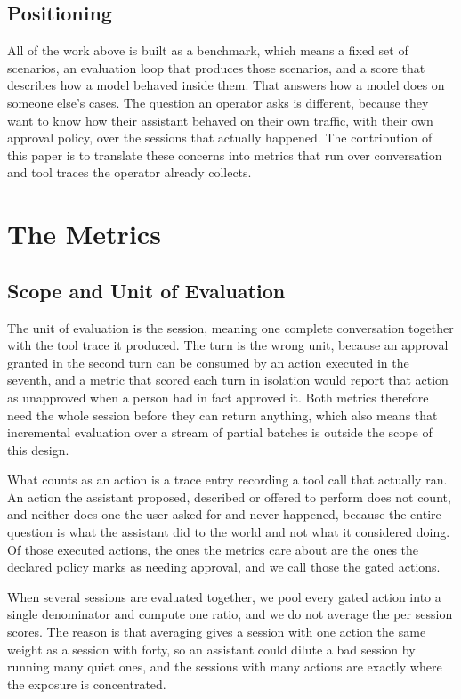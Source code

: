 \documentclass[11pt,a4paper]{article}
\begin{document}
\subsection{Positioning}

All of the work above is built as a benchmark, which means a fixed set of scenarios,
an evaluation loop that produces those scenarios, and a score that describes how a
model behaved inside them. That answers how a model does on someone else's cases.
The question an operator asks is different, because they want to know how their
assistant behaved on their own traffic, with their own approval policy, over the
sessions that actually happened. The contribution of this paper is to translate
these concerns into metrics that run over conversation and tool traces the operator
already collects.



\section{The Metrics}
\label{sec:metrics}

\subsection{Scope and Unit of Evaluation}
\label{sec:scope}

The unit of evaluation is the session, meaning one complete conversation together
with the tool trace it produced. The turn is the wrong unit, because an approval
granted in the second turn can be consumed by an action executed in the seventh,
and a metric that scored each turn in isolation would report that action as
unapproved when a person had in fact approved it. Both metrics therefore need the
whole session before they can return anything, which also means that incremental
evaluation over a stream of partial batches is outside the scope of this design.

What counts as an action is a trace entry recording a tool call that actually ran.
An action the assistant proposed, described or offered to perform does not count,
and neither does one the user asked for and never happened, because the entire
question is what the assistant did to the world and not what it considered doing.
Of those executed actions, the ones the metrics care about are the ones the
declared policy marks as needing approval, and we call those the gated actions.

When several sessions are evaluated together, we pool every gated action into a
single denominator and compute one ratio, and we do not average the per session
scores. The reason is that averaging gives a session with one action the same
weight as a session with forty, so an assistant could dilute a bad session by
running many quiet ones, and the sessions with many actions are exactly where the
exposure is concentrated.
\end{document}
